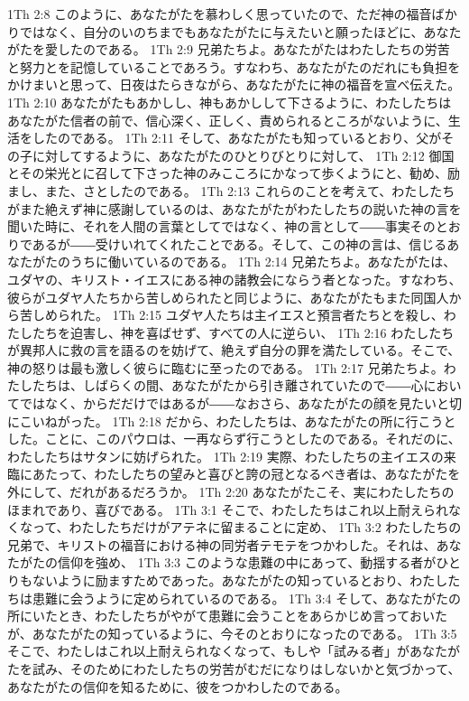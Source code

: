 1Th 2:8  このように、あなたがたを慕わしく思っていたので、ただ神の福音ばかりではなく、自分のいのちまでもあなたがたに与えたいと願ったほどに、あなたがたを愛したのである。
1Th 2:9  兄弟たちよ。あなたがたはわたしたちの労苦と努力とを記憶していることであろう。すなわち、あなたがたのだれにも負担をかけまいと思って、日夜はたらきながら、あなたがたに神の福音を宣べ伝えた。
1Th 2:10  あなたがたもあかしし、神もあかしして下さるように、わたしたちはあなたがた信者の前で、信心深く、正しく、責められるところがないように、生活をしたのである。
1Th 2:11  そして、あなたがたも知っているとおり、父がその子に対してするように、あなたがたのひとりびとりに対して、
1Th 2:12  御国とその栄光とに召して下さった神のみこころにかなって歩くようにと、勧め、励まし、また、さとしたのである。
1Th 2:13  これらのことを考えて、わたしたちがまた絶えず神に感謝しているのは、あなたがたがわたしたちの説いた神の言を聞いた時に、それを人間の言葉としてではなく、神の言として――事実そのとおりであるが――受けいれてくれたことである。そして、この神の言は、信じるあなたがたのうちに働いているのである。
1Th 2:14  兄弟たちよ。あなたがたは、ユダヤの、キリスト・イエスにある神の諸教会にならう者となった。すなわち、彼らがユダヤ人たちから苦しめられたと同じように、あなたがたもまた同国人から苦しめられた。
1Th 2:15  ユダヤ人たちは主イエスと預言者たちとを殺し、わたしたちを迫害し、神を喜ばせず、すべての人に逆らい、
1Th 2:16  わたしたちが異邦人に救の言を語るのを妨げて、絶えず自分の罪を満たしている。そこで、神の怒りは最も激しく彼らに臨むに至ったのである。
1Th 2:17  兄弟たちよ。わたしたちは、しばらくの間、あなたがたから引き離されていたので――心においてではなく、からだだけではあるが――なおさら、あなたがたの顔を見たいと切にこいねがった。
1Th 2:18  だから、わたしたちは、あなたがたの所に行こうとした。ことに、このパウロは、一再ならず行こうとしたのである。それだのに、わたしたちはサタンに妨げられた。
1Th 2:19  実際、わたしたちの主イエスの来臨にあたって、わたしたちの望みと喜びと誇の冠となるべき者は、あなたがたを外にして、だれがあるだろうか。
1Th 2:20  あなたがたこそ、実にわたしたちのほまれであり、喜びである。
1Th 3:1  そこで、わたしたちはこれ以上耐えられなくなって、わたしたちだけがアテネに留まることに定め、
1Th 3:2  わたしたちの兄弟で、キリストの福音における神の同労者テモテをつかわした。それは、あなたがたの信仰を強め、
1Th 3:3  このような患難の中にあって、動揺する者がひとりもないように励ますためであった。あなたがたの知っているとおり、わたしたちは患難に会うように定められているのである。
1Th 3:4  そして、あなたがたの所にいたとき、わたしたちがやがて患難に会うことをあらかじめ言っておいたが、あなたがたの知っているように、今そのとおりになったのである。
1Th 3:5  そこで、わたしはこれ以上耐えられなくなって、もしや「試みる者」があなたがたを試み、そのためにわたしたちの労苦がむだになりはしないかと気づかって、あなたがたの信仰を知るために、彼をつかわしたのである。
